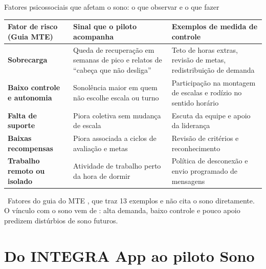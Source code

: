\documentclass[aspectratio=169,10pt]{beamer}
\newcommand{\fonte}[1]{\par\vfill{\tiny\color{mudo}\faBookOpen\ #1\par}}
\begin{document}
\begin{frame}{Fatores psicossociais que afetam o sono: o que observar e o que fazer}
\scriptsize
\begin{tabularx}{\textwidth}{@{}>{\bfseries}p{3.1cm} L L@{}}
\toprule
Fator de risco (Guia MTE) & Sinal que o piloto acompanha & Exemplos de medida de controle \\
\midrule
Sobrecarga & Queda de recuperação em semanas de pico e relatos de \enquote{cabeça que não desliga} & Teto de horas extras, revisão de metas, redistribuição de demanda \\
Baixo controle e autonomia & Sonolência maior em quem não escolhe escala ou turno & Participação na montagem de escalas e rodízio no sentido horário \\
Falta de suporte & Piora coletiva sem mudança de escala & Escuta da equipe e apoio da liderança \\
Baixas recompensas & Piora associada a ciclos de avaliação e metas & Revisão de critérios e reconhecimento \\
Trabalho remoto ou isolado & Atividade de trabalho perto da hora de dormir & Política de desconexão e envio programado de mensagens \\
\bottomrule
\end{tabularx}
\fonte{Fatores do guia do MTE \parencite{mte_guia_psicossociais_2025}, que traz 13 exemplos e não cita o sono
  diretamente. O vínculo com o sono vem de \textcite{linton2015}: alta demanda, baixo controle e
  pouco apoio predizem distúrbios de sono futuros.}
\end{frame}

\section{Do INTEGRA App ao piloto Sono}
\end{document}
